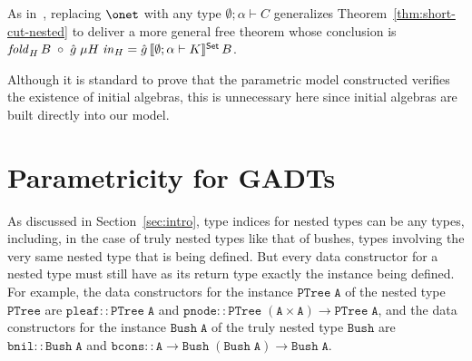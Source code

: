 \documentclass{lmcs}
\theoremstyle{plain}\newtheorem{satz}[thm]{Satz}
\begin{document}
{\vspace*{0.05in}

As in~\cite{jg10}, replacing $\onet$ with any type $\emptyset;\alpha
\vdash C$ generalizes Theorem~\ref{thm:short-cut-nested} to deliver a
more general free theorem whose conclusion is $\mathit{fold}_{H}\, B
\; \circ \; \hat{g}\; \mu H \; \mathit{in}_{H} = \hat{g}
\,\llbracket{\emptyset;\alpha \vdash K}\rrbracket^{\mathsf{Set}}\, B$.

\vspace*{0.05in}

Although it is standard to prove that the parametric model constructed
verifies the existence of initial algebras, this is unnecessary here
since initial algebras are built directly into our model.

\section{Parametricity for GADTs}\label{sec:GADTs}

As discussed in Section~\ref{sec:intro}, type indices for nested types
can be any types, including, in the case of truly nested types like
that of bushes, types involving the very same nested type that is
being defined. But every data constructor for a nested type must still
have as its return type exactly the instance being defined. For
example, the data constructors for the instance $\mathtt{PTree\; A}$ of the
nested type $\mathtt{PTree}$ are $\mathtt{pleaf :: PTree\; A}$ and
$\mathtt{pnode :: PTree\; (A \times A) \to PTree\; A}$, and
the data constructors for the instance $\mathtt{Bush \;A}$ of the truly
nested type $\mathtt{Bush}$ are $\mathtt{bnil :: Bush\; A}$ and
$\mathtt{bcons :: A \to Bush\; (Bush\; A) \to Bush\; A}$.

}
\end{document}
